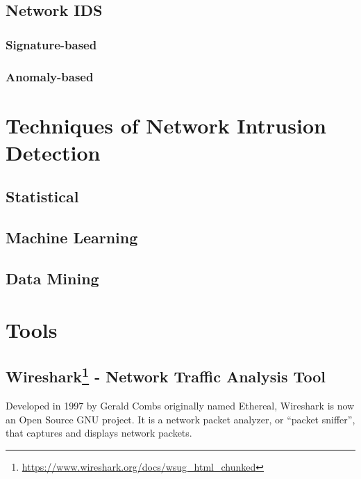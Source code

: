 \documentclass[]{article}
\let\rmarkdownfootnote\footnote%
\def\footnote{\protect\rmarkdownfootnote}
\begin{document}
\subsection{Network IDS}\label{network-ids}

\subsubsection{Signature-based}\label{signature-based}

\subsubsection{Anomaly-based}\label{anomaly-based}

\section{Techniques of Network Intrusion
Detection}\label{techniques-of-network-intrusion-detection}

\subsection{Statistical}\label{statistical}

\subsection{Machine Learning}\label{machine-learning}

\subsection{Data Mining}\label{data-mining}

\section{Tools}\label{tools}

\subsection[Wireshark - Network Traffic Analysis
Tool]{Wireshark\footnote{\url{https://www.wireshark.org/docs/wsug_html_chunked}}
- Network Traffic Analysis
Tool}\label{wireshark1---network-traffic-analysis-tool}

Developed in 1997 by Gerald Combs originally named Ethereal, Wireshark
is now an Open Source GNU project. It is a network packet analyzer, or
``packet sniffer'', that captures and displays network packets.
\end{document}
